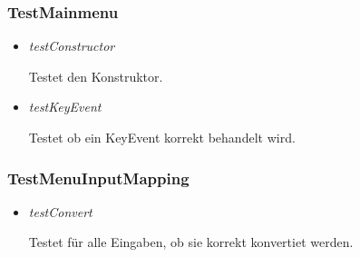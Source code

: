 \subsubsection{TestMainmenu}
\begin{itemize}
    \item \textit{testConstructor}
        \begin{leftbar}[0.9\linewidth]
            Testet den Konstruktor.
        \end{leftbar}
    \item \textit{testKeyEvent}
        \begin{leftbar}[0.9\linewidth]
            Testet ob ein KeyEvent korrekt behandelt wird.
        \end{leftbar}
\end{itemize}

\subsubsection{TestMenuInputMapping}
\begin{itemize}
    \item \textit{testConvert}
        \begin{leftbar}[0.9\linewidth]
            Testet für alle Eingaben, ob sie korrekt konvertiet werden.
        \end{leftbar}
\end{itemize}

